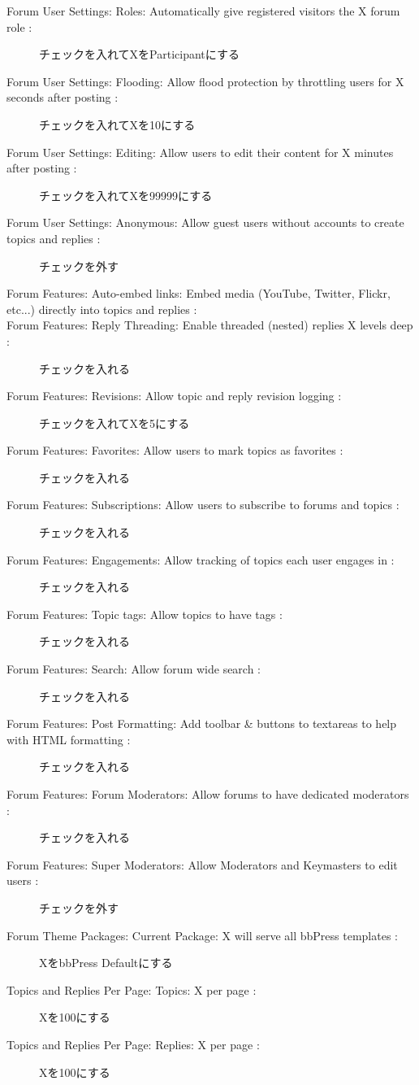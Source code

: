 \documentclass[titlepage,10pt,a4paper,uplatex]{jsbook}
\begin{document}
\begin{description}
\item[Forum User Settings: Roles: Automatically give registered visitors the X forum role : ] チェックを入れてXをParticipantにする
\item[Forum User Settings: Flooding: Allow flood protection by throttling users for X seconds after posting : ] チェックを入れてXを10にする
\item[Forum User Settings: Editing: Allow users to edit their content for X minutes after posting : ] チェックを入れてXを99999にする
\item[Forum User Settings: Anonymous: Allow guest users without accounts to create topics and replies : ] チェックを外す
\item[Forum Features: Auto-embed links: Embed media (YouTube, Twitter, Flickr, etc...) directly into topics and replies : ] 
\item[Forum Features: Reply Threading: Enable threaded (nested) replies X levels deep : ] チェックを入れる
\item[Forum Features: Revisions: Allow topic and reply revision logging : ] チェックを入れてXを5にする
\item[Forum Features: Favorites: Allow users to mark topics as favorites : ] チェックを入れる
\item[Forum Features: Subscriptions: Allow users to subscribe to forums and topics : ] チェックを入れる
\item[Forum Features: Engagements: Allow tracking of topics each user engages in : ] チェックを入れる
\item[Forum Features: Topic tags: Allow topics to have tags : ] チェックを入れる
\item[Forum Features: Search: Allow forum wide search : ] チェックを入れる
\item[Forum Features: Post Formatting: Add toolbar \& buttons to textareas to help with HTML formatting : ] チェックを入れる
\item[Forum Features: Forum Moderators: Allow forums to have dedicated moderators : ] チェックを入れる
\item[Forum Features: Super Moderators: Allow Moderators and Keymasters to edit users : ] チェックを外す
\item[Forum Theme Packages: Current Package: X will serve all bbPress templates : ] XをbbPress Defaultにする
\item[Topics and Replies Per Page: Topics: X per page : ] Xを100にする
\item[Topics and Replies Per Page: Replies: X per page : ] Xを100にする

\end{description}
\end{document}
